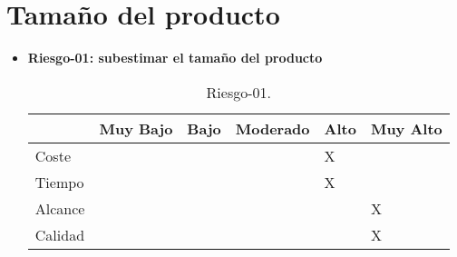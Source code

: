 \section{Tamaño del producto}
\begin{itemize}
	\item \textbf{Riesgo-01: subestimar el tamaño del producto}
	\begin{table}[h]
	\begin{center}
	\begin{tabular}{ l l l l l l }
	\hline
	& Muy Bajo & Bajo & Moderado & Alto & Muy Alto \\ \hline \hline
	Coste &  &  &  & X &  \\ \hline
	Tiempo &  &  &  & X &  \\ \hline
	Alcance &  &  &  &  & X \\ \hline
	Calidad &  &  &  &  & X \\ \hline
	\end{tabular}
	\caption{Riesgo-01.}
	\label{Riesgo-01}
	\end{center}
	\end{table}
\end{itemize}

